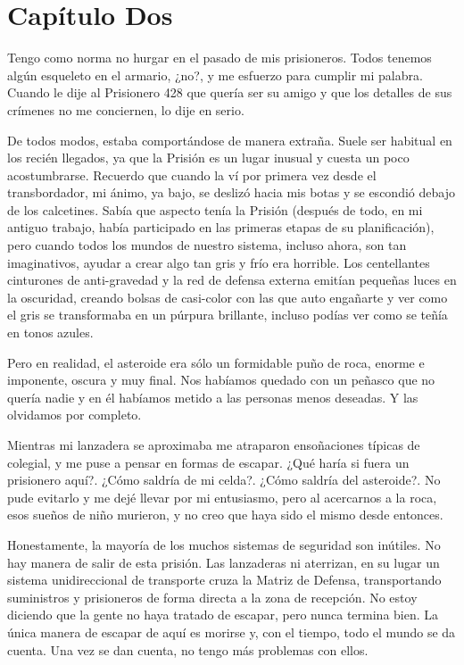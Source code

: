 \chapter*{Capítulo Dos}

Tengo como norma no hurgar en el pasado de mis prisioneros. Todos
tenemos algún esqueleto en el armario, ¿no?, y me esfuerzo para cumplir
mi palabra. Cuando le dije al Prisionero 428 que quería ser su amigo y
que los detalles de sus crímenes no me conciernen, lo dije en serio.

De todos modos, estaba comportándose de manera extraña. Suele ser
habitual en los recién llegados, ya que la Prisión es un lugar inusual y
cuesta un poco acostumbrarse. Recuerdo que cuando la ví por primera vez
desde el transbordador, mi ánimo, ya bajo, se deslizó hacia mis botas y
se escondió debajo de los calcetines. Sabía que aspecto tenía la Prisión
(después de todo, en mi antiguo trabajo, había participado en las
primeras etapas de su planificación), pero cuando todos los mundos de
nuestro sistema, incluso ahora, son tan imaginativos, ayudar a crear
algo tan gris y frío era horrible. Los centellantes cinturones de
anti-gravedad y la red de defensa externa emitían pequeñas luces en la
oscuridad, creando bolsas de casi-color con las que auto engañarte y ver
como el gris se transformaba en un púrpura brillante, incluso podías ver
como se teñía en tonos azules.

Pero en realidad, el asteroide era sólo un formidable puño de roca,
enorme e imponente, oscura y muy final. Nos habíamos quedado con un
peñasco que no quería nadie y en él habíamos metido a las personas menos
deseadas. Y las olvidamos por completo.

Mientras mi lanzadera se aproximaba me atraparon ensoñaciones típicas de
colegial, y me puse a pensar en formas de escapar. ¿Qué haría si fuera
un prisionero aquí?. ¿Cómo saldría de mi celda?. ¿Cómo saldría del
asteroide?. No pude evitarlo y me dejé llevar por mi entusiasmo, pero al
acercarnos a la roca, esos sueños de niño murieron, y no creo que haya
sido el mismo desde entonces.

Honestamente, la mayoría de los muchos sistemas de seguridad son
inútiles. No hay manera de salir de esta prisión. Las lanzaderas ni
aterrizan, en su lugar un sistema unidireccional de transporte cruza la
Matriz de Defensa, transportando suministros y prisioneros de forma
directa a la zona de recepción. No estoy diciendo que la gente no haya
tratado de escapar, pero nunca termina bien. La única manera de escapar
de aquí es morirse y, con el tiempo, todo el mundo se da cuenta. Una vez
se dan cuenta, no tengo más problemas con ellos.

